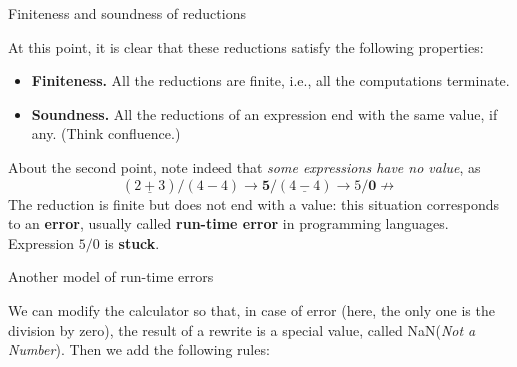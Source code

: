 \documentclass[compress,dvipdfmx]{beamer}
\newcommand{\NaN}{\textsf{NaN}\xspace}
\begin{document}
%
\begin{frame}{Finiteness and soundness of reductions}

  At this point, it is clear that these reductions satisfy the
  following properties:
  \begin{itemize}

    \item \textbf{Finiteness.} All the reductions are finite, i.e.,
      all the computations terminate.

    \item \textbf{Soundness.} All the reductions of an expression end
      with the same value, if any. (Think confluence.)

  \end{itemize}

  About the second point, note indeed that \emph{some expressions have
  no value}, as
  \begin{equation*}
    (\underline{2+3})/(4-4) \rightarrow \textbf{5}/(\underline{4-4})
    \rightarrow 5/\textbf{0} \nrightarrow
  \end{equation*}
  The reduction is finite but does not end with a value: this
  situation corresponds to an \textbf{error}, usually called
  \textbf{run\hyp{}time error} in programming languages. Expression
  \(5/0\) is \textbf{stuck}.

\end{frame}

%
\begin{frame}{Another model of run-time errors}

  We can modify the calculator so that, in case of error (here, the
  only one is the division by zero), the result of a rewrite is a
  special value, called \NaN (\emph{Not a Number}). Then we add the
  following rules:

\end{frame}
\end{document}
